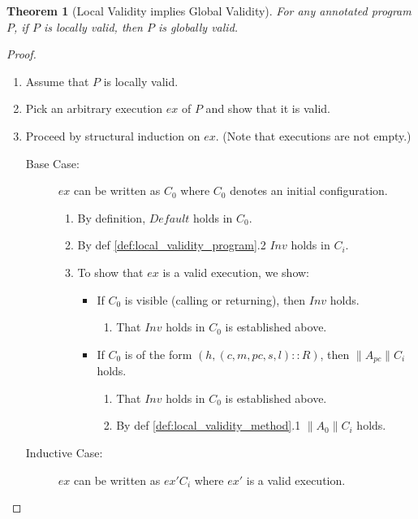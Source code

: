 \documentclass[a4paper,11pt]{article}
\newtheorem{theorem}{Theorem}
\newcommand{\Inv}{\mathit{Inv}}
\newcommand{\Default}{\mathit{Default}}
\newcommand{\pc}{\mathit{pc}}
\newcommand{\ex}{\mathit{ex}}
\newcommand{\sect}[1]{\noindent\parbox{\textwidth}{#1}}
\begin{document}
\sect{
\begin{theorem}[Local Validity implies Global Validity]
  For any annotated program $P$, if $P$ is locally valid, then $P$ is globally valid.
\end{theorem}

\begin{proof}
\begin{enumerate}
\item Assume that $P$ is locally valid.
\item Pick an arbitrary execution $\ex$ of $P$ and show that it is valid.
\item Proceed by structural induction on $\ex$. (Note that executions are not empty.)
  \begin{description}
  \item[Base Case:] $\ex$ can be written as $C_0$ where $C_0$ denotes an initial configuration.
    
    \begin{enumerate}
    \item By definition, $\Default$ holds in $C_0$.
    \item By def \ref{def:local_validity_program}.2 $\Inv$ holds in $C_i$.
    \item To show that $\ex$ is a valid execution, we show:
      \begin{itemize}
      \item If $C_0$ is visible (calling or returning), then $\Inv$ holds.
        
        \begin{enumerate}
        \item That $\Inv$ holds in $C_0$ is established above.
        \end{enumerate}
        
      \item If $C_0$ is of the form $(h, (c, m, \pc, s, l)::R)$, then $\| A_{\pc} \| C_i$ holds.
        
        \begin{enumerate}
        \item That $\Inv$ holds in $C_0$ is established above.
        \item By def \ref{def:local_validity_method}.1 $\|A_0\|C_i$ holds.
        \end{enumerate}

      \end{itemize}
    \end{enumerate}
    
    
  \item[Inductive Case:] $\ex$ can be written as $\ex'C_i$ where $\ex'$ is a valid execution.
    

\end{description}
\end{enumerate}
\end{proof}}
\end{document}
